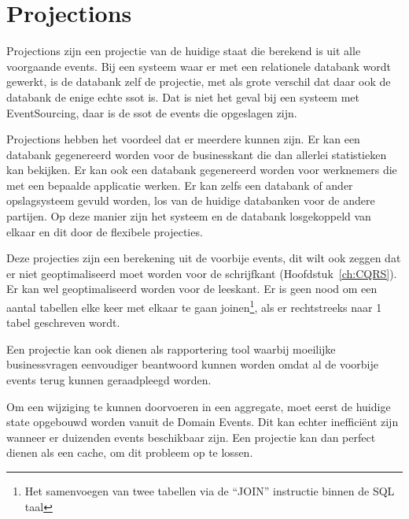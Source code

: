 
\section{Projections}
\label{sec:projections}

Projections zijn een projectie van de huidige staat die berekend is uit alle voorgaande events. Bij een systeem waar er met een relationele databank wordt gewerkt, is de databank zelf de projectie, met als grote verschil dat daar ook de databank de enige echte \gls{ssot} is. Dat is niet het geval bij een systeem met EventSourcing, daar is de \gls{ssot} de events die opgeslagen zijn.

Projections hebben het voordeel dat er meerdere kunnen zijn. Er kan een databank gegenereerd worden voor de businesskant die dan allerlei statistieken kan bekijken. Er kan ook een databank gegenereerd worden voor werknemers die met een bepaalde applicatie werken. Er kan zelfs een databank of ander opslagsysteem gevuld worden, los van de huidige databanken voor de andere partijen. Op deze manier zijn het systeem en de databank losgekoppeld van elkaar en dit door de flexibele projecties. 

Deze projecties zijn een berekening uit de voorbije events, dit wilt ook zeggen dat er niet geoptimaliseerd moet worden voor de schrijfkant (Hoofdstuk~\ref{ch:CQRS}). Er kan wel geoptimaliseerd worden voor de leeskant. Er is geen nood om een aantal tabellen elke keer met elkaar te gaan joinen\footnote{Het samenvoegen van twee tabellen via de ``JOIN'' instructie binnen de \gls{SQL} taal}, als er rechtstreeks naar 1 tabel geschreven wordt.

Een projectie kan ook dienen als rapportering tool waarbij moeilijke businessvragen eenvoudiger beantwoord kunnen worden omdat al de voorbije events terug kunnen geraadpleegd worden.

Om een wijziging te kunnen doorvoeren in een aggregate, moet eerst de huidige state opgebouwd worden vanuit de Domain Events. Dit kan echter inefficiënt zijn wanneer er duizenden events beschikbaar zijn. Een projectie kan dan perfect dienen als een \gls{cache}, om dit probleem op te lossen.
